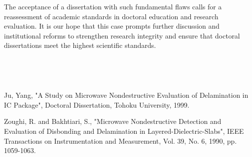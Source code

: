 \documentclass[10pt,twocolumn]{article}
\begin{document}
The acceptance of a dissertation with such fundamental flaws calls for a reassessment of academic standards in doctoral education and research evaluation. It is our hope that this case prompts further discussion and institutional reforms to strengthen research integrity and ensure that doctoral dissertations meet the highest scientific standards.


$\,$

$\,$

\begin{thebibliography}{99}

 Ju, Yang, "A Study on Microwave Nondestructive Evaluation of Delamination in IC Package", Doctoral Dissertation, Tohoku University, 1999.

 Zoughi, R. and Bakhtiari, S., "Microwave Nondestructive Detection and Evaluation of Disbonding and Delamination in Layered-Dielectric-Slabs", IEEE Transactions on Instrumentation and Measurement, Vol. 39, No. 6, 1990, pp. 1059-1063.

\end{thebibliography}
\end{document}
